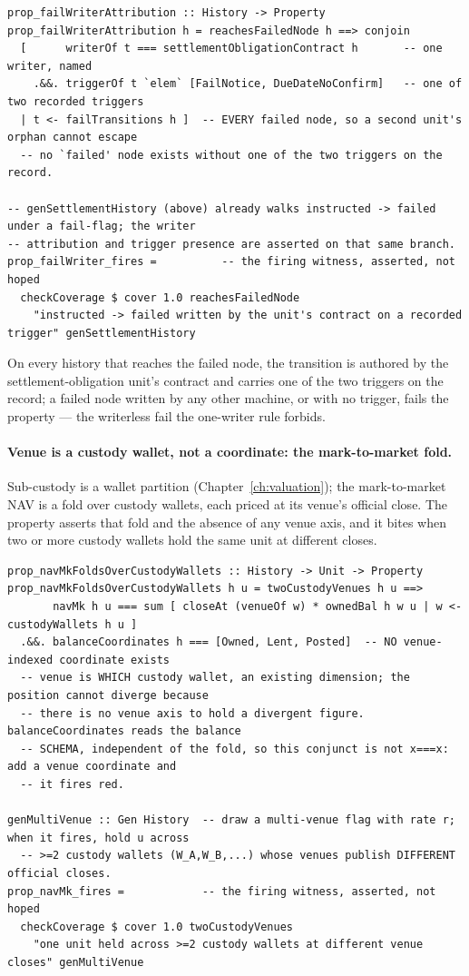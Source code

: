 \documentclass[11pt,a4paper]{article}
\begin{document}
\begin{lstlisting}
prop_failWriterAttribution :: History -> Property
prop_failWriterAttribution h = reachesFailedNode h ==> conjoin
  [      writerOf t === settlementObligationContract h       -- one writer, named
    .&&. triggerOf t `elem` [FailNotice, DueDateNoConfirm]   -- one of two recorded triggers
  | t <- failTransitions h ]  -- EVERY failed node, so a second unit's orphan cannot escape
  -- no `failed' node exists without one of the two triggers on the record.

-- genSettlementHistory (above) already walks instructed -> failed under a fail-flag; the writer
-- attribution and trigger presence are asserted on that same branch.
prop_failWriter_fires =          -- the firing witness, asserted, not hoped
  checkCoverage $ cover 1.0 reachesFailedNode
    "instructed -> failed written by the unit's contract on a recorded trigger" genSettlementHistory
\end{lstlisting}

On every history that reaches the failed node, the transition is authored by the
settlement-obligation unit's contract and carries one of the two triggers on the record; a failed
node written by any other machine, or with no trigger, fails the property --- the writerless fail the
one-writer rule forbids.

\paragraph{Venue is a custody wallet, not a coordinate: the mark-to-market fold.}
Sub-custody is a wallet partition (Chapter~\ref{ch:valuation}); the mark-to-market NAV is a
fold over custody wallets, each priced at its venue's official close. The property asserts
that fold and the absence of any venue axis, and it bites when two or more custody wallets
hold the same unit at different closes.

\begin{lstlisting}
prop_navMkFoldsOverCustodyWallets :: History -> Unit -> Property
prop_navMkFoldsOverCustodyWallets h u = twoCustodyVenues h u ==>
       navMk h u === sum [ closeAt (venueOf w) * ownedBal h w u | w <- custodyWallets h u ]
  .&&. balanceCoordinates h === [Owned, Lent, Posted]  -- NO venue-indexed coordinate exists
  -- venue is WHICH custody wallet, an existing dimension; the position cannot diverge because
  -- there is no venue axis to hold a divergent figure. balanceCoordinates reads the balance
  -- SCHEMA, independent of the fold, so this conjunct is not x===x: add a venue coordinate and
  -- it fires red.

genMultiVenue :: Gen History  -- draw a multi-venue flag with rate r; when it fires, hold u across
  -- >=2 custody wallets (W_A,W_B,...) whose venues publish DIFFERENT official closes.
prop_navMk_fires =            -- the firing witness, asserted, not hoped
  checkCoverage $ cover 1.0 twoCustodyVenues
    "one unit held across >=2 custody wallets at different venue closes" genMultiVenue
\end{lstlisting}
\end{document}
